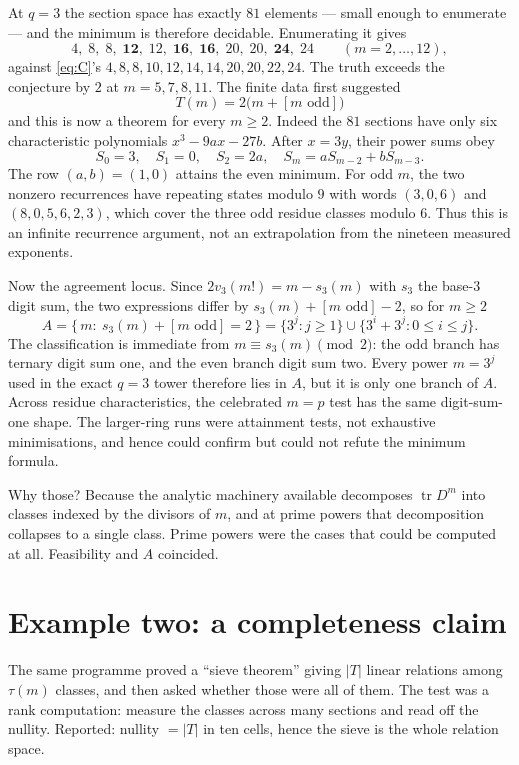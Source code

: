 \documentclass[11pt]{article}
\theoremstyle{plain}
\theoremstyle{definition}
\begin{document}
At $q=3$ the section space has exactly $81$ elements --- small enough to
enumerate --- and the minimum is therefore decidable. Enumerating it gives
\[
4,\;8,\;8,\;\mathbf{12},\;12,\;\mathbf{16},\;\mathbf{16},\;20,\;20,\;
\mathbf{24},\;24 \qquad(m=2,\dots,12),
\]
against \eqref{eq:C}'s $4,8,8,10,12,14,14,20,20,22,24$. The truth exceeds the
conjecture by $2$ at $m=5,7,8,11$.  The finite data first suggested
\[
T(m)=2\bigl(m+[m\text{ odd}]\bigr)
\]
and this is now a theorem for every $m\ge2$.  Indeed the $81$ sections have
only six characteristic polynomials $x^3-9ax-27b$.  After $x=3y$, their power
sums obey
\[
 S_0=3,\quad S_1=0,\quad S_2=2a,\quad
 S_m=aS_{m-2}+bS_{m-3}.
\]
The row $(a,b)=(1,0)$ attains the even minimum.  For odd $m$, the two
nonzero recurrences have repeating states modulo $9$ with words
$(3,0,6)$ and $(8,0,5,6,2,3)$, which cover the three odd residue classes
modulo $6$.  Thus this is an infinite recurrence argument, not an extrapolation
from the nineteen measured exponents.

Now the agreement locus. Since $2v_3(m!)=m-s_3(m)$ with $s_3$ the base-$3$
digit sum, the two expressions differ by $s_3(m)+[m\text{ odd}]-2$, so for
$m\ge2$
\[
A=\{\,m:\ s_3(m)+[m\text{ odd}]=2\,\}
 =\{3^j:j\ge1\}\cup
   \{3^i+3^j:0\le i\le j\}.
\]
The classification is immediate from $m\equiv s_3(m)\pmod2$: the odd branch
has ternary digit sum one, and the even branch digit sum two.  Every power
$m=3^j$ used in the exact $q=3$ tower therefore lies in $A$, but it is only
one branch of $A$.  Across residue characteristics, the celebrated $m=p$ test
has the same digit-sum-one shape.  The larger-ring runs were attainment tests,
not exhaustive minimisations, and hence could confirm but could not refute the
minimum formula.

Why those? Because the analytic machinery available decomposes
$\operatorname{tr}D^m$ into classes indexed by the divisors of $m$, and at
prime powers that decomposition collapses to a single class. Prime powers were
the cases that could be computed at all. Feasibility and $A$ coincided.

\section{Example two: a completeness claim}

The same programme proved a ``sieve theorem'' giving $|T|$ linear relations
among $\tau(m)$ classes, and then asked whether those were all of them. The
test was a rank computation: measure the classes across many sections and read
off the nullity. Reported: nullity $=|T|$ in ten cells, hence the sieve is the
whole relation space.
\end{document}
